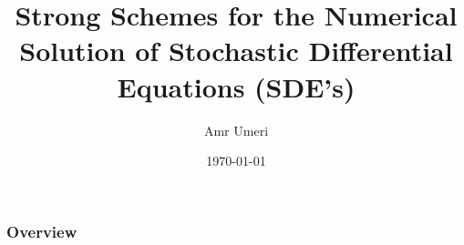 \documentclass{beamer}
\title[Numerical methods for SDE's]{Strong Schemes for the Numerical Solution of Stochastic Differential Equations (SDE's) } %
\author{Amr Umeri}
\institute[University of Bern] %
{
University of Bern \\ %
\medskip
\textit{amr.umeri@outlook.com} %
}
\date{\today} %
\begin{document}
\begin{frame}
\titlepage %
\end{frame}

\begin{frame}
\frametitle{Overview} %
\tableofcontents %
\end{frame}


\end{document}
